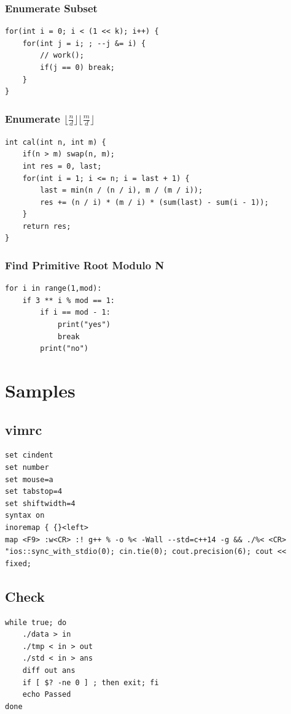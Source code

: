 \documentclass[10pt]{ctexart}
\begin{document}
{{\subsubsection{Enumerate Subset}
\begin{lstlisting}
for(int i = 0; i < (1 << k); i++) {
    for(int j = i; ; --j &= i) {
        // work();
        if(j == 0) break;
    }
}
\end{lstlisting}
\subsubsection{Enumerate $\lfloor\frac{n}{d}\rfloor\lfloor\frac{m}{d}\rfloor$}
\begin{lstlisting}
int cal(int n, int m) {
    if(n > m) swap(n, m);
    int res = 0, last;
    for(int i = 1; i <= n; i = last + 1) {
        last = min(n / (n / i), m / (m / i));
        res += (n / i) * (m / i) * (sum(last) - sum(i - 1));
    }
    return res;
}
\end{lstlisting}
\subsubsection{Find Primitive Root Modulo N}
\begin{lstlisting}
for i in range(1,mod):
    if 3 ** i % mod == 1:
        if i == mod - 1:
            print("yes")
            break
        print("no")
\end{lstlisting}






\newpage
\section{Samples}
\subsection{vimrc}
\begin{lstlisting}
set cindent
set number
set mouse=a
set tabstop=4
set shiftwidth=4
syntax on
inoremap { {}<left>
map <F9> :w<CR> :! g++ % -o %< -Wall --std=c++14 -g && ./%< <CR>
"ios::sync_with_stdio(0); cin.tie(0); cout.precision(6); cout << fixed;
\end{lstlisting}

\subsection{Check}
\begin{lstlisting}
while true; do
    ./data > in
    ./tmp < in > out
    ./std < in > ans
    diff out ans
    if [ $? -ne 0 ] ; then exit; fi
    echo Passed
done
\end{lstlisting}

}}
\end{document}
